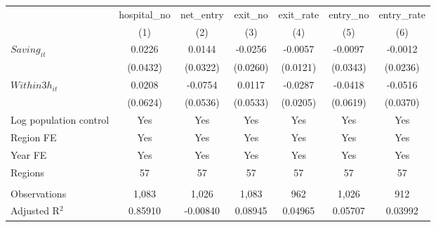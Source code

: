 \begingroup
\centering
\begin{tabular}{lcccccc}
   \toprule
                          & hospital\_no  & net\_entry  & exit\_no  & exit\_rate  & entry\_no  & entry\_rate \\    
                          & (1)           & (2)         & (3)       & (4)         & (5)        & (6)\\  
   \midrule 
   $Saving_{it}$          & 0.0226        & 0.0144      & -0.0256   & -0.0057     & -0.0097    & -0.0012\\   
                          & (0.0432)      & (0.0322)    & (0.0260)  & (0.0121)    & (0.0343)   & (0.0236)\\   
   $Within3h_{it}$        & 0.0208        & -0.0754     & 0.0117    & -0.0287     & -0.0418    & -0.0516\\   
                          & (0.0624)      & (0.0536)    & (0.0533)  & (0.0205)    & (0.0619)   & (0.0370)\\   
   Log population control & Yes           & Yes         & Yes       & Yes         & Yes        & Yes\\  
   Region FE              & Yes           & Yes         & Yes       & Yes         & Yes        & Yes\\  
   Year FE                & Yes           & Yes         & Yes       & Yes         & Yes        & Yes\\  
   Regions                & 57            & 57          & 57        & 57          & 57         & 57\\  
    \\
   Observations           & 1,083         & 1,026       & 1,083     & 962         & 1,026      & 912\\  
   Adjusted R$^2$         & 0.85910       & -0.00840    & 0.08945   & 0.04965     & 0.05707    & 0.03992\\  
   \bottomrule
\end{tabular}
\par\endgroup
